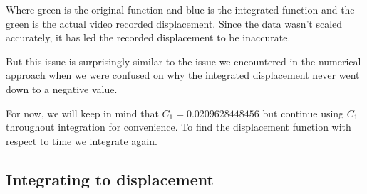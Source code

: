 \documentclass[12pt]{article}
\begin{document}
Where green is the original function and blue is the integrated function and the green is the actual video recorded displacement. Since the data wasn't scaled accurately, it has led the recorded displacement to be inaccurate.

But this issue is surprisingly similar to the issue we encountered in the numerical approach when we were confused on why the integrated displacement never went down to a negative value.


For now, we will keep in mind that $C_{1} = 0.0209628448456$ but continue using $C_{1}$ throughout integration for convenience. To find the displacement function with respect to time we integrate again.


\subsection{Integrating to displacement}
\end{document}
